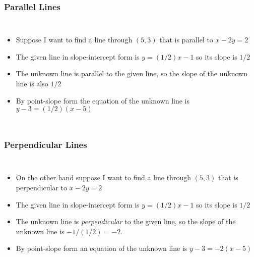 \documentclass[serif,ignorenonframetext]{beamer}
\begin{document}
\begin{frame}
  \frametitle{Parallel Lines}
  \begin{columns}
    \begin{itemize}[<+->]
    \item Suppose I want to find a line through $(5,3)$
      that is parallel to $x-2y=2$
    \item The given line in slope-intercept form is $y=(1/2)x-1$
      so its slope is $1/2$
    \item The unknown line is parallel to the given line, so the slope
      of the unknown line is also $1/2$
    \item By point-slope form the equation of the unknown line is
      $y-3=(1/2)(x-5)$
    \end{itemize}
  \end{columns}
\end{frame}

\begin{frame}
  \frametitle{Perpendicular Lines}
  \begin{columns}
    \begin{itemize}[<+->]
    \item On the other hand suppose I want to find a line through $(5,3)$
      that is perpendicular to $x-2y=2$
    \item The given line in slope-intercept form is $y=(1/2)x-1$
      so its slope is $1/2$
    \item The unknown line is \textit{perpendicular} to the given
      line, so the slope of the unknown line is $-1/(1/2)=-2$.
    \item By point-slope form an equation of the unknown line is
      $y-3=-2(x-5)$
    \end{itemize}
  \end{columns}
\end{frame}
\end{document}
